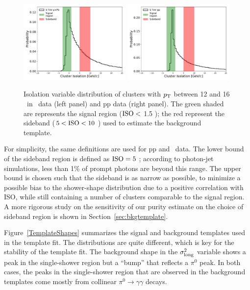 \begin{figure}[hbtp]
\center
\includegraphics[width=0.49\textwidth]{Data_Analysis/Purity/IsolationSideband_limited_Skimmed_13def_root}
\includegraphics[width=0.49\textwidth]{Data_Analysis/Purity/IsolationSideband_limited_Skimmed_17q_root}
\caption{Isolation variable distribution of clusters with $p_{\mathrm{T}}$ between 12 and 16 \GeVc~in \pPb~data (left panel) and pp data (right panel). The green shaded are represents the signal region ($\mathrm{ISO}<$ 1.5 \GeVc); the red represent the sideband ($5<\mathrm{ISO}<10$ \GeVc) used to estimate the background template.}
\label{SidebandDefinition}
\end{figure}

For simplicity, the same definitions are used for pp and \pPb~data. The lower bound of the sideband region is defined as {$\mathrm{ISO}=5$ \GeVc}; according to photon-jet simulations, less than 1$\%$ of prompt photons are beyond this range. The upper bound is chosen such that the sideband is as narrow as possible, to minimize a possible bias to the shower-shape distribution due to a positive correlation with ISO, while still containing a number of clusters comparable to the signal region. A more rigorous study on the sensitivity of our purity estimate on the choice of sideband region is shown in Section~\ref{sec:bkgtemplate}.

Figure~\ref{TemplateShapes} summarizes the signal and background templates used in the template fit. The distributions are quite different, which is key for the stability of the template fit. The background shape in the $\sigma^{2}_{\mathrm{long}}$ variable shows a peak in the single-shower region but a ``bump'' that reflects a $\pi^{0}$ peak. In both cases, the peaks in the single-shower region that are observed in the background templates come mostly from collinear $\pi^{0}\to\gamma\gamma$ decays.

